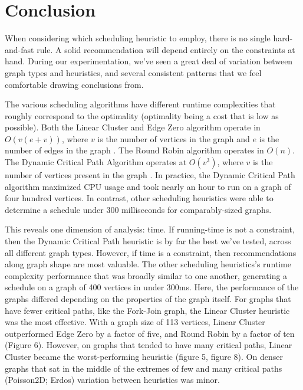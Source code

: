 \documentclass[11pt, oneside]{article}   	%
\begin{document}
\section{Conclusion}

When considering which scheduling heuristic to employ, there is no single hard-and-fast rule. A solid recommendation will depend entirely on the constraints at hand. During our experimentation, we've seen a great deal of variation between graph types and heuristics, and several consistent patterns that we feel comfortable drawing conclusions from.

The various scheduling algorithms have different runtime complexities that roughly correspond to the optimality (optimality being a cost that is low as possible). Both the Linear Cluster and Edge Zero algorithm operate in $O(v(e + v))$, where $v$ is the number of vertices in the graph and $e$ is the number of edges in the graph \cite{lit-review}\cite{edge-zero}\cite{linear-cluster}. The Round Robin algorithm operates in $O(n)$. The Dynamic Critical Path Algorithm operates at $O(v^3)$, where $v$ is the number of vertices present in the graph \cite{lit-review}\cite{dcp}. In practice, the Dynamic Critical Path algorithm maximized CPU usage and took nearly an hour to run on a graph of four hundred vertices. In contrast, other scheduling heuristics were able to determine a schedule under 300 milliseconds for comparably-sized graphs.

This reveals one dimension of analysis: time. If running-time is not a constraint, then the Dynamic Critical Path heuristic is by far the best we've tested, across all different graph types. However, if time is a constraint, then recommendations along graph shape are most valuable. The other scheduling heuristics's runtime complexity performance that was broadly similar to one another, generating a schedule on a graph of 400 vertices in under 300ms. Here, the performance of the graphs differed depending on the properties of the graph itself. For graphs that have fewer critical paths, like the Fork-Join graph, the Linear Cluster heuristic was the most effective. With a graph size of 113 vertices, Linear Cluster outperformed Edge Zero by a factor of five, and Round Robin by a factor of ten (Figure 6). However, on graphs that tended to have many critical paths, Linear Cluster became the worst-performing heuristic (figure 5, figure 8). On denser graphs that sat in the middle of the extremes of few and many critical paths (Poisson2D; Erdos) variation between heuristics was minor.
\end{document}
